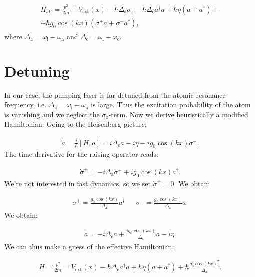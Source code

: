\begin{align}
\begin{split}
H_\text{JC} = \frac{p^2}{2m} + V_\text{ext}(x) - \hbar \Delta_\text{a} \sigma_z - \hbar \Delta_\text{c} a^\dagger a + \hbar \eta (a + a^\dagger) + \\
+ \hbar g_0 \cos(kx) (\sigma^+ a + \sigma^- a^\dagger),
\end{split}
\end{align}where $\Delta_\text{a} = \omega_\text{l} - \omega_\text{a}$ and $\Delta_\text{c} = \omega_\text{l} - \omega_\text{c}$.

\section{Detuning}
In our case, the pumping laser is far detuned from the atomic resonance frequency, i.e. $\Delta_\text{a} = \omega_\text{l} - \omega_\text{a}$ is large. Thus the excitation probability of the atom is vanishing and we neglect the $\sigma_z$-term. Now we derive heuristically a modified Hamiltonian. Going to the Heisenberg picture:

\begin{align}
\dot{a} = \frac{i}{\hbar} [H, a] = i \Delta_\text{c} a - i \eta -i g_0 \cos(kx) \sigma^-.
\end{align}The time-derivative for the raising operator reads:

\begin{align}
\dot{\sigma}^+ = -i \Delta_\text{a} \sigma^+ + i g_0 \cos(kx) a^\dagger.
\end{align}We're not interested in fast dynamics, so we set $\dot{\sigma}^+ = 0$. We obtain

\begin{align}
\sigma^+ = \frac{g_0 \cos(kx)}{\Delta_\text{a}} a^\dagger && \sigma^- = \frac{g_0 \cos(kx)}{\Delta_\text{a}} a.
\end{align}We obtain:

\begin{align}
\dot{a} = -i \Delta_\text{c} a + \frac{i g_0 \cos(kx)}{\Delta_\text{a}} a - i \eta.
\end{align}We can thus make a guess of the effective Hamiltonian:

\begin{align}
H = \frac{p^2}{2m} = V_\text{ext}(x) - \hbar \Delta_\text{c} a^\dagger a + \hbar \eta (a + a^\dagger) + \hbar \frac{g_0^2 \cos(kx)^2}{\Delta_\text{a}}.
\end{align}